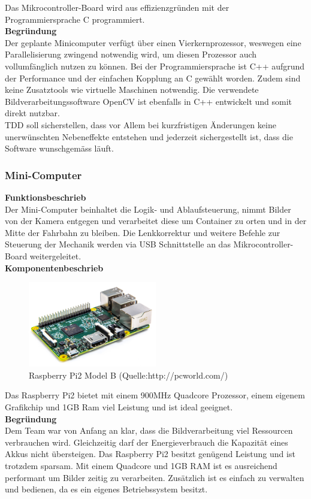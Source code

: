 Das Mikrocontroller-Board wird aus effizienzgründen mit der Programmiersprache C programmiert.\\[0.2cm]
\textbf{Begründung}\\[0.2cm]
Der geplante Minicomputer verfügt über einen Vierkernprozessor, weswegen eine Parallelisierung zwingend notwendig wird, um diesen Prozessor auch vollumfänglich nutzen zu können. Bei der Programmiersprache ist C++ aufgrund der Performance und der einfachen Kopplung an C gewählt worden. Zudem sind keine Zusatztools wie virtuelle Maschinen notwendig. Die verwendete Bildverarbeitungssoftware OpenCV ist ebenfalls in C++ entwickelt und somit direkt nutzbar.\\
TDD soll sicherstellen, dass vor Allem bei kurzfristigen Änderungen keine unerwünschten Nebeneffekte entstehen und jederzeit sichergestellt ist, dass die Software wunschgemäss läuft.
\subsubsection{Mini-Computer}
\textbf{Funktionsbeschrieb}\\[0.2cm]
Der Mini-Computer beinhaltet die Logik- und Ablaufsteuerung, nimmt Bilder von der Kamera entgegen und verarbeitet diese um Container zu orten und in der Mitte der Fahrbahn zu bleiben. Die Lenkkorrektur und weitere Befehle zur Steuerung der Mechanik werden via USB Schnittstelle an das Mikrocontroller-Board weitergeleitet.\\[0.2cm]
\textbf{Komponentenbeschrieb}
\begin{figure}[H]
	\centering
	\includegraphics[width=0.5\textwidth]{03_Loesungskonzept/pictures/raspberrypi2.png}
	\caption{Raspberry Pi2 Model B (Quelle:http://pcworld.com/)}
\end{figure}\flushleft
Das Raspberry Pi2 bietet mit einem 900MHz Quadcore Prozessor, einem eigenem Grafikchip und 1GB Ram viel Leistung und ist ideal geeignet.\\[0.2cm]
\textbf{Begründung}\\[0.2cm]
Dem Team war von Anfang an klar, dass die Bildverarbeitung viel Ressourcen verbrauchen wird. Gleichzeitig darf der Energieverbrauch die Kapazität eines Akkus nicht übersteigen. Das Raspberry Pi2 besitzt genügend Leistung und ist trotzdem sparsam. Mit einem Quadcore und 1GB RAM ist es ausreichend performant um Bilder zeitig zu verarbeiten. Zusätzlich ist es einfach zu verwalten und bedienen, da es ein eigenes Betriebssystem besitzt.
